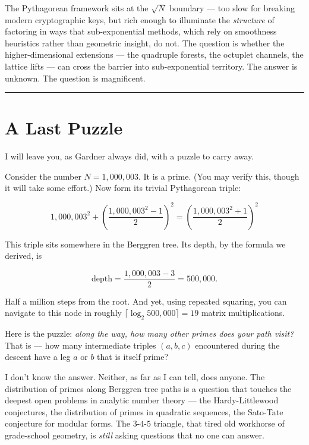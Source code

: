 \documentclass[12pt, letterpaper, openany]{book}
\theoremstyle{definition}
\theoremstyle{remark}
\begin{document}
The Pythagorean framework sits at the $\sqrt{N}$ boundary --- too slow for breaking modern cryptographic keys, but rich enough to illuminate the \textit{structure} of factoring in ways that sub-exponential methods, which rely on smoothness heuristics rather than geometric insight, do not. The question is whether the higher-dimensional extensions --- the quadruple forests, the octuplet channels, the lattice lifts --- can cross the barrier into sub-exponential territory. The answer is unknown. The question is magnificent.


\bigskip\noindent\rule{\textwidth}{0.4pt}\bigskip



\section*{A Last Puzzle}


I will leave you, as Gardner always did, with a puzzle to carry away.

Consider the number $N = 1{,}000{,}003$. It is a prime. (You may verify this, though it will take some effort.) Now form its trivial Pythagorean triple:

\[
1{,}000{,}003^2 + \left(\frac{1{,}000{,}003^2 - 1}{2}\right)^{\!2} = \left(\frac{1{,}000{,}003^2 + 1}{2}\right)^{\!2}
\]

This triple sits somewhere in the Berggren tree. Its depth, by the formula we derived, is

\[
\text{depth} = \frac{1{,}000{,}003 - 3}{2} = 500{,}000.
\]

Half a million steps from the root. And yet, using repeated squaring, you can navigate to this node in roughly $\lceil \log_2 500{,}000 \rceil = 19$ matrix multiplications.

Here is the puzzle: \textit{along the way, how many other primes does your path visit?} That is --- how many intermediate triples $(a, b, c)$ encountered during the descent have a leg $a$ or $b$ that is itself prime?

I don't know the answer. Neither, as far as I can tell, does anyone. The distribution of primes along Berggren tree paths is a question that touches the deepest open problems in analytic number theory --- the Hardy-Littlewood conjectures, the distribution of primes in quadratic sequences, the Sato-Tate conjecture for modular forms. The $3$-$4$-$5$ triangle, that tired old workhorse of grade-school geometry, is \textit{still} asking questions that no one can answer.
\end{document}
